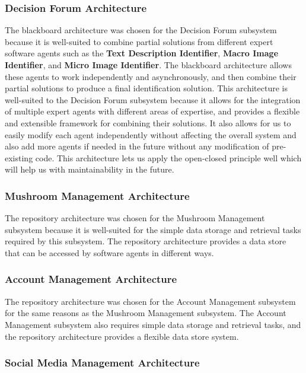 \documentclass[]{article}
\begin{document}
\subsubsection{Decision Forum Architecture}

The blackboard architecture was chosen for the Decision Forum subsystem because it is well-suited
to combine partial solutions from different expert software agents such as the \textbf{Text Description Identifier},
\textbf{Macro Image Identifier}, and \textbf{Micro Image Identifier}. The blackboard architecture
allows these agents to work independently and asynchronously, and then combine their partial 
solutions to produce a final identification solution. This architecture is well-suited to the 
Decision Forum subsystem because it allows for the integration of multiple expert agents with 
different areas of expertise, and provides a flexible and extensible framework for combining 
their solutions. It also allows for us to easily modify each agent independently without affecting
the overall system and also add more agents if needed in the future without any modification of pre-existing
code. This architecture lets us apply the open-closed principle well which will help us with maintainability
in the future.

\subsubsection{Mushroom Management Architecture}

The repository architecture was chosen for the Mushroom Management subsystem because it is well-suited
for the simple data storage and retrieval tasks required by this subsystem. The repository architecture
provides a data store that can be accessed by software agents in different ways.

\subsubsection{Account Management Architecture}

The repository architecture was chosen for the Account Management subsystem for the same reasons 
as the Mushroom Management subsystem. The Account Management subsystem also requires simple data
storage and retrieval tasks, and the repository architecture provides a flexible data store 
system.

\subsubsection{Social Media Management Architecture}
\end{document}

